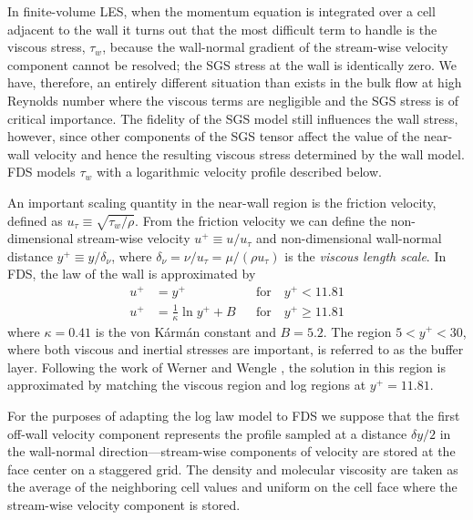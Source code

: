 In finite-volume LES, when the momentum equation is integrated over a cell adjacent to the wall it turns out that the most difficult term to handle is the viscous stress, $\tau_w$, because the wall-normal gradient of the stream-wise velocity component cannot be resolved; the SGS stress at the wall is identically zero.  We have, therefore, an entirely different situation than exists in the bulk flow at high Reynolds number where the viscous terms are negligible and the SGS stress is of critical importance.  The fidelity of the SGS model still influences the wall stress, however, since other components of the SGS tensor affect the value of the near-wall velocity and hence the resulting viscous stress determined by the wall model. FDS models $\tau_w$ with a logarithmic velocity profile \cite{Pope:2000} described below.

An important scaling quantity in the near-wall region is the friction velocity, defined as $u_\tau \equiv \sqrt{\tau_w/\rho}$.
From the friction velocity we can define the non-dimensional stream-wise velocity $u^+ \equiv u/u_\tau$ and non-dimensional wall-normal distance $y^+ \equiv y/\delta_\nu$, where $\delta_\nu = \nu/u_\tau = \mu/(\rho u_\tau)$ is the \emph{viscous length scale}. In FDS, the law of the wall is approximated by
\begin{align}
\label{eqn_visclayer} u^+ &= y^+                           && \mbox{for} \quad y^+ < 11.81 \\
\label{eqn_loglaw}    u^+ &= \frac{1}{\kappa} \ln y^+ + B  && \mbox{for} \quad y^+ \ge 11.81
\end{align}
where $\kappa = 0.41$ is the von K\'arm\'an constant and $B=5.2$.  The region $5 < y^+ < 30$, where both viscous and inertial stresses are important, is referred to as the buffer layer.  Following the work of Werner and Wengle \cite{Werner:1991}, the solution in this region is approximated by matching the viscous region and log regions at $y^+ = 11.81$.


For the purposes of adapting the log law model to FDS we suppose that the first off-wall velocity component represents the profile sampled at a distance $\delta y/2$ in the wall-normal direction---stream-wise components of velocity are stored at the face center on a staggered grid.  The density and molecular viscosity are taken as the average of the neighboring cell values and uniform on the cell face where the stream-wise velocity component is stored.

